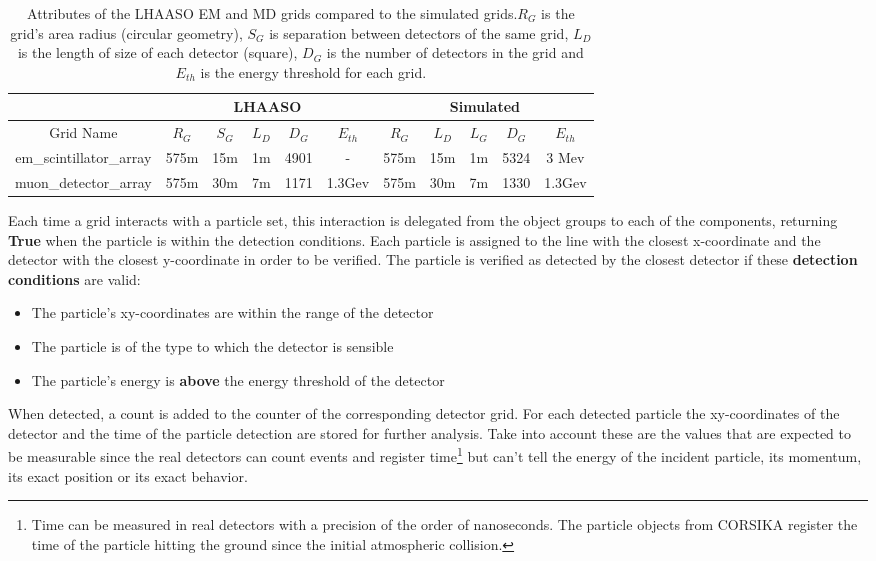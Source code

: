 \documentclass{article}
\begin{document}
\begin{table}[h!]
\centering
\begin{tabular}[]{c|ccccc|ccccc}
\hline
  & \multicolumn{5}{c}{LHAASO}  & \multicolumn{5}{c}{Simulated} \tabularnewline
\hline
   Grid Name & \textbf{$R_G$} &\textbf{$S_G$} & \textbf{$L_D$} & \textbf{$D_G$} & \textbf{$E_{th}$} & \textbf{$R_G$} & \textbf{$L_D$} &\textbf{$L_G$} & \textbf{$D_G$} & \textbf{$E_{th}$} \\
  \hline
  em\_scintillator\_array & 575m & 15m & 1m & 4901 & - & 575m & 15m & 1m & 5324 & 3 Mev \\
  muon\_detector\_array & 575m & 30m & 7m & 1171 & 1.3Gev & 575m & 30m & 7m & 1330 & 1.3Gev \\

  \hline
\end{tabular}
    \caption{Attributes of the LHAASO EM and MD grids compared to the simulated grids.$R_G$ is the grid's area radius (circular geometry), $S_G$ is separation between detectors of the same grid, $L_D$ is the length of size of each detector (square), $D_G$ is the number of detectors in the grid and $E_{th}$ is the energy threshold for each grid.}
    \label{tab:gridchars}
\end{table}


Each time a grid interacts with a particle set, this interaction is delegated from the object groups to each of the components, returning \textbf{True} when the particle is within the detection conditions. Each particle is assigned to the line with the closest x-coordinate and the detector with the closest y-coordinate in order to be verified. The particle is verified as detected by the closest detector if these \textbf{detection conditions} are valid:
\begin{itemize}
    \item The particle's xy-coordinates are within the range of the detector
    \item The particle is of the type to which the detector is sensible
    \item The particle's energy is \textbf{above} the energy threshold of the detector
\end{itemize}
When detected, a count is added to the counter of the corresponding detector grid. For each detected particle the xy-coordinates of the detector and the time of the particle detection are stored for further analysis. Take into account these are the values that are expected to  be measurable since the real detectors can count events and register time\footnote{Time can be measured in real detectors with a precision of the order of nanoseconds. The particle objects from CORSIKA register the time of the particle hitting the ground since the initial atmospheric collision.} but can't tell the energy of the incident particle, its momentum, its exact position  or its exact behavior. 
\end{document}
